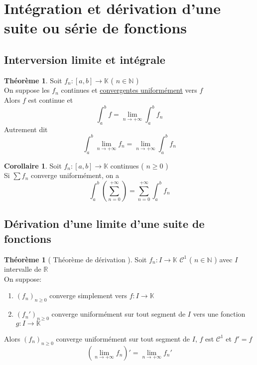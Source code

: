 \documentclass[10pt,a4paper]{article}
\theoremstyle{definition}
\newtheorem{theorem}[proposition]{Théorème}
\newtheorem{corollaire}[proposition]{Corollaire}
\begin{document}
\section{Intégration et dérivation d'une suite ou série de fonctions}
\subsection{Interversion limite et intégrale}
\begin{theorem}
    Soit $f_n: [a, b] \to \mathbb{K}$ ( $n \in \mathbb{N}$ ) \\
    On suppose les $f_n$ continues et \uline{convergentes uniformément} vers $f$ \\
    Alors $f$ est continue et \[\int_{a}^{b}f = \lim_{n \to +\infty} \int_{a}^{b}f_n\]
    Autrement dit \[\boxed{\int_{a}^{b}\lim_{n \to +\infty} f_n = \lim_{n \to +\infty} \int_{a}^{b} f_n}\]
\end{theorem}
\begin{corollaire}
    Soit $f_n: [a, b] \to \mathbb{K}$ continues ( $n \geq 0$ ) \\
    Si $\sum f_n$ converge uniformément, on a
    \[\boxed{\int_{a}^{b}\left(\sum_{n = 0}^{+\infty}\right) = \sum_{n = 0}^{+\infty} \int_{a}^{b} f_n}\]
\end{corollaire}

\subsection{Dérivation d'une limite d'une suite de fonctions}
\begin{theorem}[ Théorème de dérivation ]
    Soit $f_n: I \to \mathbb{K}$ $\mathcal{C}^1$ ( $n \in \mathbb{N}$ ) avec $I$ intervalle de $\mathbb{R}$ \\
    On suppose:
    \begin{enumerate}
        \item $(f_n)_{n \geq 0}$ converge simplement vers $f: I \to \mathbb{K}$
        \item $(f_n')_{n \geq 0}$ converge uniformément sur tout segment de $I$ vers une fonction $g: I \to \mathbb{K}$
    \end{enumerate}
    Alors $(f_n)_{n \geq 0}$ converge uniformément sur tout segment de $I$, $f$ est $\mathcal{C}^1$ et $f' = f$
    \[\left(\lim_{n \to +\infty} f_n\right)' = \lim_{n \to +\infty} f_n'\]
\end{theorem}
\end{document}
